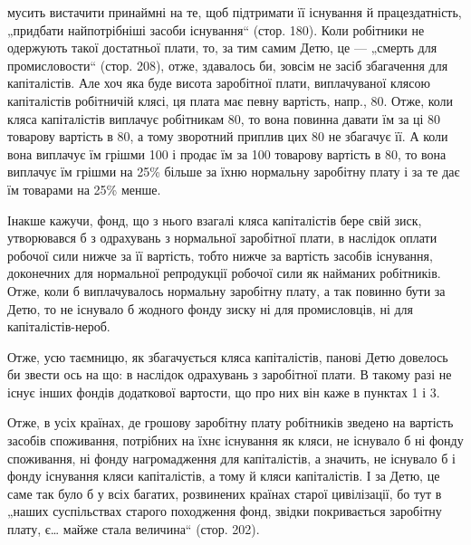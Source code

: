\parcont{}  %
мусить вистачити принаймні на те, щоб підтримати її існування й
працездатність, „придбати найпотрібніші засоби існування“ (стор. 180).
Коли робітники не одержують такої достатньої плати, то, за тим самим
Детю, це — „смерть для промисловости“ (стор. 208), отже, здавалось би,
зовсім не засіб збагачення для капіталістів. Але хоч яка буде висота заробітної
плати, виплачуваної клясою капіталістів робітничій клясі, ця плата
має певну вартість, напр., 80. Отже, коли кляса капіталістів
виплачує робітникам 80, то вона повинна давати їм за ці 80 товарову вартість в 80, а тому зворотний приплив цих
80 не збагачує її. А коли вона виплачує їм грішми 100
і продає їм за 100 товарову вартість в 80, то вона
виплачує їм грішми на 25\% більше за їхню нормальну заробітну плату
і за те дає їм товарами на 25\% менше.

Інакше кажучи, фонд, що з нього взагалі кляса капіталістів бере свій
зиск, утворювався б з одрахувань з нормальної заробітної плати, в наслідок
оплати робочої сили нижче за її вартість, тобто нижче за вартість засобів
існування, доконечних для нормальної репродукції робочої сили як
найманих робітників. Отже, коли б виплачувалось нормальну заробітну
плату, а так повинно бути за Детю, то не існувало б жодного фонду
зиску ні для промисловців, ні для капіталістів-нероб.

Отже, усю таємницю, як збагачується кляса капіталістів, панові Детю
довелось би звести ось на що: в наслідок одрахувань з заробітної плати.
В такому разі не існує інших фондів додаткової вартости, що про них
він каже в пунктах 1 і 3.

Отже, в усіх країнах, де грошову заробітну плату робітників зведено
на вартість засобів споживання, потрібних на їхнє існування як кляси,
не існувало б ні фонду споживання, ні фонду нагромадження для капіталістів,
а значить, не існувало б і фонду існування кляси капіталістів, а
тому й кляси капіталістів. І за Детю, це саме так було б у всіх багатих,
розвинених країнах старої цивілізації, бо тут в „наших суспільствах
старого походження фонд, звідки покривається заробітну плату,
є\dots{} майже стала величина“ (стор. 202).

